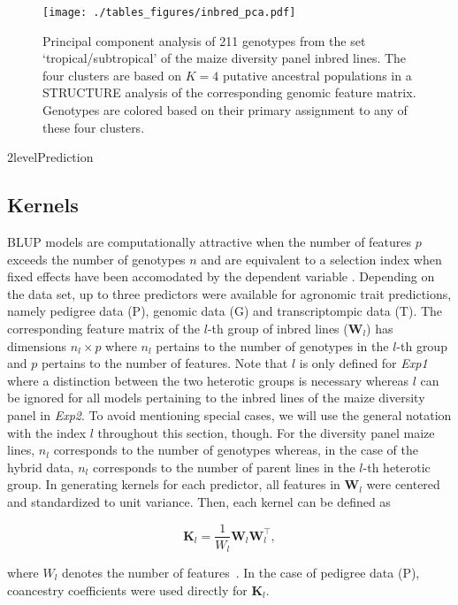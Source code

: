 \documentclass[12pt,titlepage]{article}
\begin{document}
\begin{figure}[H]
  \centering
  \texttt{[image: ./tables\_figures/inbred\_pca.pdf]}
  \caption{
  Principal component analysis of 211 genotypes from the set
  `tropical/subtropical' of the maize diversity panel inbred lines.
  The four clusters are based on $K=4$ putative ancestral populations in a
  STRUCTURE analysis of the corresponding genomic feature matrix.
  Genotypes are colored based on their primary assignment to any of these four
  clusters.
}
\label{fig:inbred-pca}
\end{figure}



\Genetics2level{Prediction}
\subsection{Kernels}
BLUP models are computationally attractive when the number of features $p$
exceeds the number of genotypes $n$ and are equivalent to a selection index
when fixed effects have been accomodated by the dependent variable 
\cite{Mrode2014}.
Depending on the data set, up to three predictors were available for agronomic
trait predictions, namely pedigree data (P), genomic data (G) and
transcriptompic data (T).
The corresponding feature matrix of the $l$-th group of inbred lines 
($\mathbf{W}_{l}$) has dimensions $n_{l} \times p$ where $n_{l}$ pertains to 
the number of genotypes in the $l$-th group and $p$ pertains to the number of 
features.
Note that $l$ is only defined for \textit{Exp1} where a distinction between 
the two heterotic groups is necessary whereas $l$ can be ignored for all 
models pertaining to the inbred lines of the maize diversity panel in 
\textit{Exp2}.
To avoid mentioning special cases, we will use the general notation with 
the index $l$ throughout this section, though.
For the diversity panel maize lines, $n_{l}$ corresponds to the number of 
genotypes whereas, in the case of the hybrid data, $n_{l}$ corresponds to the 
number of parent lines in the $l$-th heterotic group.
In generating kernels for each predictor, all features in $\mathbf{W}_{l}$ were
centered and standardized to unit variance.
Then, each kernel can be defined as

\begin{equation} \label{eq:GenomicRelationship}
  \mathbf{K}_{l} = \frac{1}{W_{l}} \mathbf{W}_{l} \mathbf{W}_{l}^{\top},
\end{equation}

where $W_{l}$ denotes the number of features~\cite{VanRaden2008}.
In the case of pedigree data (P), coancestry coefficients were used directly
for $\mathbf{K}_{l}$.
\end{document}
